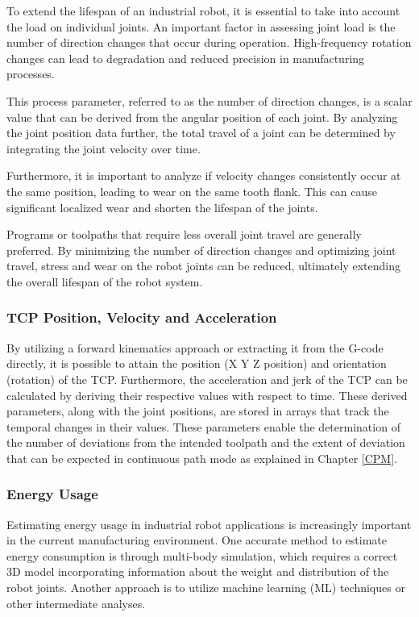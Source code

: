 To extend the lifespan of an industrial robot, it is essential to take into account the load on individual joints. An important factor in assessing joint load is the number of direction changes that occur during operation. High-frequency rotation changes can lead to degradation and reduced precision in manufacturing processes.

This process parameter, referred to as the number of direction changes, is a scalar value that can be derived from the angular position of each joint. By analyzing the joint position data further, the total travel of a joint can be determined by integrating the joint velocity over time.

Furthermore, it is important to analyze if velocity changes consistently occur at the same position, leading to wear on the same tooth flank. This can cause significant localized wear and shorten the lifespan of the joints.

Programs or toolpaths that require less overall joint travel are generally preferred. By minimizing the number of direction changes and optimizing joint travel, stress and wear on the robot joints can be reduced, ultimately extending the overall lifespan of the robot system.

\subsubsection*{TCP Position, Velocity and Acceleration}
By utilizing a forward kinematics approach or extracting it from the G-code directly, it is possible to attain the position (X Y Z position) and orientation (rotation) of the TCP. Furthermore, the acceleration and jerk of the TCP can be calculated by deriving their respective values with respect to time. These derived parameters, along with the joint positions, are stored in arrays that track the temporal changes in their values. These parameters enable the determination of the number of deviations from the intended toolpath and the extent of deviation that can be expected in continuous path mode as explained in Chapter \ref{CPM}.


\subsubsection*{Energy Usage}
Estimating energy usage in industrial robot applications is increasingly important in the current manufacturing environment. One accurate method to estimate energy consumption is through multi-body simulation, which requires a correct 3D model incorporating information about the weight and distribution of the robot joints. Another approach is to utilize machine learning (ML) techniques or other intermediate analyses.

